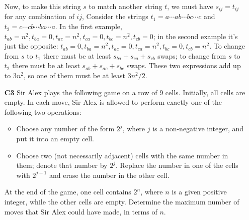 \documentclass[11pt,a4paper]{article}
\begin{document}
\begin{enumerate}
	Now, to make this string $s$ to match another string $t$, we must have $s_{ij}=t_{ij}$ for any combination of $ij$, Consider the strings $t_1=a\cdots ab\cdots bc\cdots c$ and $t_2=c\cdots cb\cdots ba\cdots a$. In the first example, $t_{ab}=n^2, t_{ba}=0, t_{ac}=n^2, t_{ca}=0, t_{bc}=n^2, t_{cb}=0$; in the second example it's just the opposite: $t_{ab}=0, t_{ba}=n^2, t_{ac}=0, t_{ca}=n^2, t_{bc}=0, t_{cb}=n^2$. To change from $s$ to $t_1$ there must be at least $s_{ba}+s_{ca}+s_{cb}$ swaps; to change from $s$ to $t_2$ there must be at least $s_{ab}+s_{ac}+s_{bc}$ swaps. These two expressions add up to $3n^2$, so one of them must be at least $3n^2/2$. 
	
	\item[\textbf{C3}]Sir Alex plays the following game on a row of 9 cells. Initially, all cells are empty. In each move, Sir Alex is allowed to perform exactly one of the following two operations:
	\begin{itemize}
	\item Choose any number of the form $2^j$, where $j$ is a non-negative integer, and put it into an empty cell.
	\item Choose two (not necessarily adjacent) cells with the same number in them; denote that number by $2^j$. Replace the number in one of the cells with $2^{j+1}$ and erase the number in the other cell.
	\end{itemize}
	At the end of the game, one cell contains $2^n$, where $n$ is a given positive integer, while the other cells are empty. Determine the maximum number of moves that Sir Alex could have made, in terms of $n$.
	

\end{enumerate}
\end{document}
